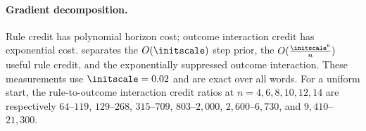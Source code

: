 \begin{table}[H]
\centering\small
{}
\caption{\textbf{Outcome escape grows exponentially while step escape stays nearly constant.} $\initscale=0.002$, zero readout;
ranges are over three draws.}
\label{tab:exit-times}
\end{table}
\paragraph{Gradient decomposition.} Rule credit has polynomial horizon cost; outcome interaction credit has exponential cost.
 separates the $O(\initscale)$ step prior, the $O(\frac{\initscale^6}{n})$ useful rule credit, and the exponentially
suppressed outcome interaction. These measurements use $\initscale=0.02$ and are exact over all words.
For a uniform start, the rule-to-outcome interaction credit ratios at $n=4,6,8,10,12,14$ are respectively
$64$--$119$, $129$--$268$, $315$--$709$, $803$--$2{,}000$, $2{,}600$--$6{,}730$, and $9{,}410$--$21{,}300$.

